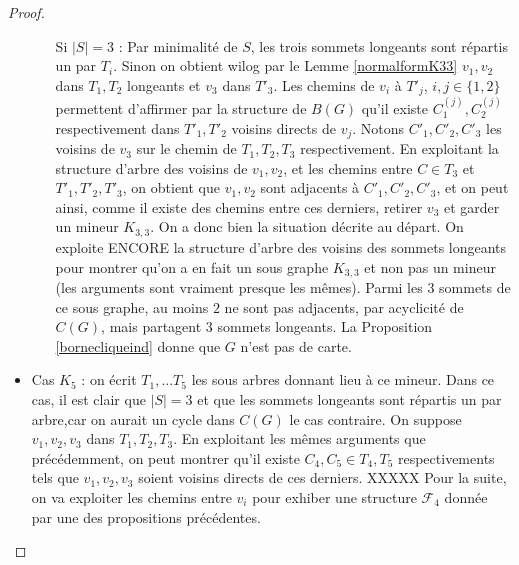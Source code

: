 \documentclass{scrartcl}
\begin{document}
\begin{flushleft}
\begin{proof}
\begin{itemize}
\begin{itemize}
            \item[Si $|S| = 3$ :] Par minimalité de $S$, les trois sommets longeants sont
            répartis un par $T_i$. Sinon on obtient wilog par le Lemme \ref{normalformK33}
            $v_1, v_2$ dans $T_1, T_2$ longeants et $v_3$ dans $T'_3$. Les chemins de $v_i$
            à $T'_j$, $i,j\in \{1,2\}$ permettent d'affirmer par la structure de $B(G)$
            qu'il existe $C^{(j)}_1, C^{(j)}_2$ respectivement dans $T'_1, T'_2$ voisins directs
            de $v_j$. Notons $C'_1, C'_2, C'_3$ les voisins de $v_3$ sur le chemin de $T_1, T_2, T_3$
            respectivement. En exploitant la structure d'arbre des voisins de $v_1, v_2$, et les chemins
            entre $C \in T_3$ et $T'_1, T'_2, T'_3$, on obtient que $v_1, v_2$ sont adjacents à $C'_1, C'_2, C'_3$,
            et on peut ainsi, comme il existe des chemins entre ces derniers, retirer $v_3$ et garder
            un mineur $K_{3,3}$.
            \medskip \newline
            On a donc bien la situation décrite au départ. On exploite ENCORE la structure d'arbre
            des voisins des sommets longeants pour montrer qu'on a en fait un sous graphe $K_{3,3}$
            et non pas un mineur (les arguments sont vraiment presque les mêmes). Parmi
            les $3$ sommets de ce sous graphe, au moins $2$ ne sont pas adjacents, par acyclicité
            de $C(G)$, mais partagent $3$ sommets longeants. La Proposition \ref{bornecliqueind}
            donne que $G$ n'est pas de carte.
        \end{itemize}

        \item Cas $K_5$ : on écrit $T_1, ... T_5$ les sous arbres donnant lieu à ce mineur.
        Dans ce cas, il est clair que $|S| = 3$ et que les sommets longeants sont répartis un
        par arbre,car on aurait un cycle dans $C(G)$ le cas contraire. On suppose $v_1, v_2, v_3$
        dans $T_1, T_2, T_3$. En exploitant les mêmes arguments que précédemment, on peut montrer
        qu'il existe $C_4, C_5 \in T_4, T_5$ respectivements tels que $v_1, v_2, v_3$ soient
        voisins directs de ces derniers.\newline
        XXXXX\newline
        Pour la suite, on va exploiter les chemins entre $v_i$ pour exhiber une structure
        $\mathcal{F}_4$ donnée par une des propositions précédentes.
    \end{itemize}
\end{proof}


\end{flushleft}
\end{document}
